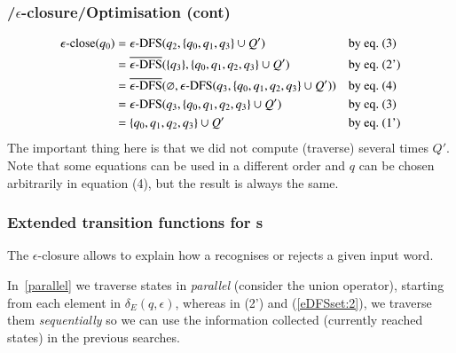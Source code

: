 %
\begin{frame}
\frametitle{\eNFA{}/\(\epsilon\)-closure/Optimisation (cont)}

\begin{align*}
   \epsilon\text{-close} (q_0)
&= \epsilon\text{-DFS} (q_2, \{q_0, q_1, q_3\} \cup Q')
&& \text{by eq.~(3)}\\
&= \overline{\epsilon\text{-DFS}} (\{q_3\}, \{q_0, q_1, q_2, q_3\} \cup Q')
&& \text{by eq.~(2')}\\
&= \overline{\epsilon\text{-DFS}} (\varnothing, \epsilon\text{-DFS} (q_3, \{q_0, q_1, q_2, q_3\} \cup Q'))
&& \text{by eq.~(4)}\\
&= \epsilon\text{-DFS} (q_3, \{q_0, q_1, q_2, q_3\} \cup Q')
&& \text{by eq.~(3)}\\
&= \{q_0, q_1, q_2, q_3\} \cup Q'
&& \text{by eq.~(1')}\\
\end{align*}
The important thing here is that we did not compute (traverse) several
times \(Q'\). Note that some equations can be used in a different
order and \(q\) can be chosen arbitrarily in equation (4), but the
result is always the same.

\end{frame}

%
\begin{frame}
\frametitle{Extended transition functions for {\eNFA}s}

The \(\epsilon\)-closure allows to explain how a \eNFA recognises or
rejects a given input word.
\bigskip

In~\eqref{parallel} we traverse states in \emph{parallel} (consider
the union operator), starting from each element in \(\delta_E (q,
\epsilon)\), whereas in (2') and (\ref{eDFSset:2}), we traverse them
\emph{sequentially} so we can use the information collected (currently
reached states) in the previous searches.

\end{frame}

